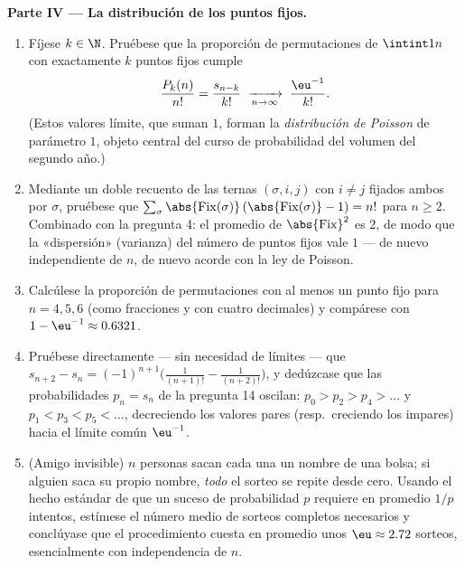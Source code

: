 \begin{problem}
\medskip
\noindent\textbf{Parte IV --- La distribución de los puntos fijos.}
\begin{enumerate}[resume]
  \item Fíjese $k \in \N$. Pruébese que la proporción de
        permutaciones de $\intint1n$ con exactamente $k$ puntos fijos cumple
        \[
        \frac{P_k(n)}{n!} = \frac{s_{n-k}}{k!}
        \;\xrightarrow[n \to \infty]{}\; \frac{\eu^{-1}}{k!} .
        \]
        (Estos valores límite, que suman $1$, forman la
        \emph{distribución de Poisson} de parámetro $1$, objeto central
        del curso de probabilidad del volumen del segundo año.)
  \item Mediante un doble recuento de las ternas $(\sigma, i, j)$ con
        $i \neq j$ fijados ambos por $\sigma$, pruébese que
        $\sum_\sigma \abs{\mathrm{Fix}(\sigma)}\,
        (\abs{\mathrm{Fix}(\sigma)} - 1) = n!$ para $n \geq 2$.
        Combinado con la pregunta 4: el promedio de
        $\abs{\mathrm{Fix}}^2$ es $2$, de modo que la «dispersión»
        (varianza) del número de puntos fijos vale $1$ --- de nuevo
        independiente de $n$, de nuevo acorde con la ley de Poisson.
  \item Calcúlese la proporción de permutaciones con al menos un punto
        fijo para $n = 4, 5, 6$ (como fracciones y con cuatro
        decimales) y compárese con $1 - \eu^{-1} \approx 0.6321$.
  \item Pruébese directamente --- sin necesidad de límites --- que
        $s_{n+2} - s_n = (-1)^{n+1}\bigl(\frac1{(n+1)!} -
        \frac1{(n+2)!}\bigr)$, y dedúzcase que las probabilidades
        $p_n = s_n$ de la pregunta 14 oscilan: $p_0 > p_2 > p_4 > \dots$
        y $p_1 < p_3 < p_5 < \dots$, decreciendo los valores pares
        (resp.\ creciendo los impares) hacia el límite común $\eu^{-1}$.
  \item (Amigo invisible) $n$ personas sacan cada una un nombre de una
        bolsa; si alguien saca su propio nombre, \emph{todo} el sorteo
        se repite desde cero. Usando el hecho estándar de que un suceso
        de probabilidad $p$ requiere en promedio $1/p$ intentos,
        estímese el número medio de sorteos completos necesarios y
        conclúyase que el procedimiento cuesta en promedio unos
        $\eu \approx 2.72$ sorteos, esencialmente con independencia
        de $n$.
\end{enumerate}


\end{problem}
